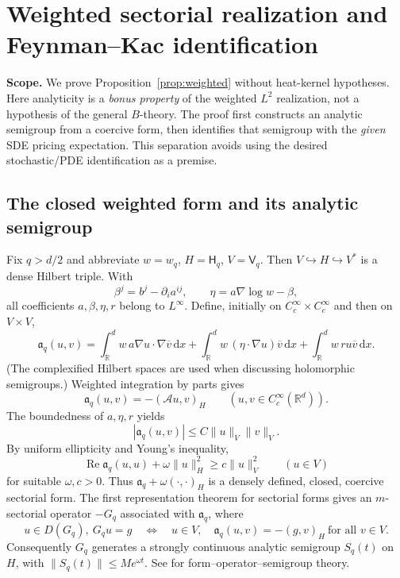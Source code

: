 \documentclass[11pt,a4paper]{article}
\theoremstyle{definition}\newtheorem{definition}{Definition}[section]\newtheorem{example}[theorem]{Example}
\theoremstyle{remark}\newtheorem{remark}[theorem]{Remark}\newtheorem{remarkSix}{Remark}[section]
\newcommand{\Rd}{\mathbb R^d}
\newcommand{\Cc}{C_c^\infty}
\newcommand{\dd}{\,\mathrm d}
\newcommand{\norm}[1]{\lVert #1\rVert}
\newcommand{\cA}{\mathcal A}
\newcommand{\HH}{\mathsf H_q}
\newcommand{\VV}{\mathsf V_q}
\begin{document}
\clearpage
\appendix
\section{Weighted sectorial realization and Feynman--Kac identification}
\label{app:weightedproof}
\noindent\textbf{Scope.} We prove Proposition~\ref{prop:weighted} without heat-kernel hypotheses. Here analyticity is a \emph{bonus property} of the weighted $L^2$ realization, not a hypothesis of the general $B$-theory. The proof first constructs an analytic semigroup from a coercive form, then identifies that semigroup with the \emph{given} SDE pricing expectation. This separation avoids using the desired stochastic/PDE identification as a premise.

\subsection{The closed weighted form and its analytic semigroup}
\label{app:form}
Fix $q>d/2$ and abbreviate $w=w_q$, $H=\HH$, $V=\VV$. Then $V\hookrightarrow H\hookrightarrow V^*$ is a dense Hilbert triple. With
\begin{equation}\label{eq:betaw}
 \beta^j=b^j-\partial_i a^{ij},\qquad
 \eta=a\nabla\log w-\beta,
\end{equation}
all coefficients $a,\beta,\eta,r$ belong to $L^\infty$. Define, initially on $C_c^\infty\times C_c^\infty$ and then on $V\times V$,
\begin{equation}\label{eq:weightedform}
 \mathfrak a_q(u,v)=\int_\Rd w\,a\nabla u\cdot\nabla\overline v\dd x
 +\int_\Rd w\,(\eta\cdot\nabla u)\overline v\dd x
 +\int_\Rd w\,r u\overline v\dd x.
\end{equation}
(The complexified Hilbert spaces are used when discussing holomorphic semigroups.) Weighted integration by parts gives
\begin{equation}\label{eq:formmatch}
 \mathfrak a_q(u,v)=-(\cA u,v)_H
 \qquad(u,v\in\Cc(\Rd)).
\end{equation}
The boundedness of $a,\eta,r$ yields
\begin{equation}\label{eq:formbound}
 |\mathfrak a_q(u,v)|\le C\norm u_V\norm v_V.
\end{equation}
By uniform ellipticity and Young's inequality,
\begin{equation}\label{eq:gardingw}
 \operatorname{Re}\mathfrak a_q(u,u)+\omega\norm u_H^2
 \ge c\norm u_V^2
 \qquad (u\in V)
\end{equation}
for suitable $\omega,c>0$. Thus $\mathfrak a_q+\omega(\cdot,\cdot)_H$ is a densely defined, closed, coercive sectorial form. The first representation theorem for sectorial forms gives an $m$-sectorial operator $-G_q$ associated with $\mathfrak a_q$, where
\begin{equation}\label{eq:Gdef}
 u\in D(G_q),\ G_qu=g
 \quad\Longleftrightarrow\quad
 u\in V,\quad\mathfrak a_q(u,v)=-(g,v)_H\ \text{for all }v\in V.
\end{equation}
Consequently $G_q$ generates a strongly continuous analytic semigroup $S_q(t)$ on $H$, with $\norm{S_q(t)}\le Me^{\omega t}$. See \cite[Ch.~1, \S\S1.2--1.5]{ouhabaz} for form--operator--semigroup theory.
\end{document}
